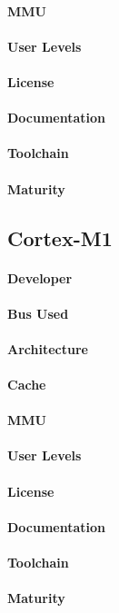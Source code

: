 \documentclass[11pt]{article} %
\begin{document}
\paragraph{MMU} 
\paragraph{User Levels} 
\paragraph{License} 
\paragraph{Documentation} 
\paragraph{Toolchain} 
\paragraph{Maturity} 

\subsection{Cortex-M1}
\paragraph{Developer} 
\paragraph{Bus Used} 
\paragraph{Architecture} 
\paragraph{Cache} 
\paragraph{MMU} 
\paragraph{User Levels} 
\paragraph{License} 
\paragraph{Documentation} 
\paragraph{Toolchain} 
\paragraph{Maturity} 
\end{document}
